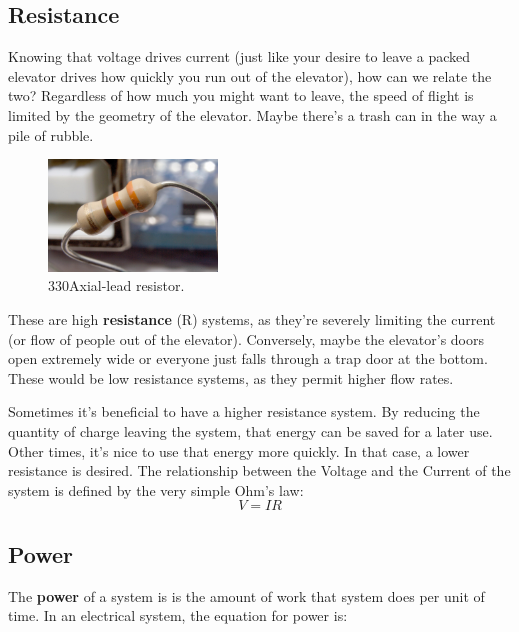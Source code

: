 \documentclass[a4paper]{article}
\begin{document}
\subsection{Resistance}
Knowing that voltage drives current (just like your desire to leave a packed elevator drives how quickly you run out of the elevator), how can we relate the two? Regardless of how much you might want to leave, the  speed of flight is limited by the geometry of the elevator. Maybe there's a trash can in the way a pile of rubble.
\newpage
\begin{figure}
  \begin{center}
    \includegraphics[width=0.4\textwidth]{resistor.jpg}
  \end{center}
  \caption{\label{fig:data}330\ohm \hspace{0.2cm}Axial-lead resistor.}
\end{figure}

These are high \textbf{resistance} (R) systems, as they're severely limiting the current (or flow of people out of the elevator). Conversely, maybe the elevator's doors open extremely wide or everyone just falls through a trap door at the bottom. These would be low resistance systems, as they permit higher flow rates.

Sometimes it's beneficial to have a higher resistance system. By reducing the quantity of charge leaving the system, that energy can be saved for a later use. Other times, it's nice to use that energy more quickly. In that case, a lower resistance is desired.
The relationship between the Voltage and the Current of the system is defined by the very simple Ohm's law:
\begin{equation} \label{eq:ohm}
V = IR
\end{equation}

\subsection{Power}
The \textbf{power} of a system is is the amount of work that system does per unit of time. In an electrical system, the equation for power is:
\end{document}
